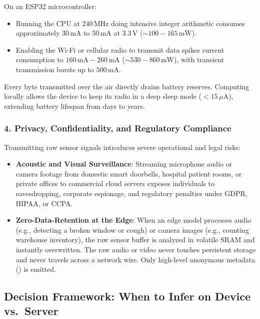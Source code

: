 On an ESP32 microcontroller:
\begin{itemize}
    \item Running the CPU at $240\,\text{MHz}$ doing intensive integer arithmetic consumes approximately $30\,\text{mA}$ to $50\,\text{mA}$ at $3.3\,\text{V}$ ($\sim 100 - 165\,\text{mW}$).
    \item Enabling the Wi-Fi or cellular radio to transmit data spikes current consumption to $160\,\text{mA} - 260\,\text{mA}$ ($\sim 530 - 860\,\text{mW}$), with transient transmission bursts up to $500\,\text{mA}$.
\end{itemize}
Every byte transmitted over the air directly drains battery reserves. Computing locally allows the device to keep its radio in a deep sleep mode ($< 15\,\mu\text{A}$), extending battery lifespan from days to years.

\subsubsection{4. Privacy, Confidentiality, and Regulatory Compliance}
Transmitting raw sensor signals introduces severe operational and legal risks:
\begin{itemize}
    \item \textbf{Acoustic and Visual Surveillance}: Streaming microphone audio or camera footage from domestic smart doorbells, hospital patient rooms, or private offices to commercial cloud servers exposes individuals to eavesdropping, corporate espionage, and regulatory penalties under GDPR, HIPAA, or CCPA.
    \item \textbf{Zero-Data-Retention at the Edge}: When an edge model processes audio (e.g., detecting a broken window or cough) or camera images (e.g., counting warehouse inventory), the raw sensor buffer is analyzed in volatile SRAM and instantly overwritten. The raw audio or video never touches persistent storage and never travels across a network wire. Only high-level anonymous metadata () is emitted.
\end{itemize}

\subsection{Decision Framework: When to Infer on Device vs.\ Server}\label{subsec:decision_framework}

